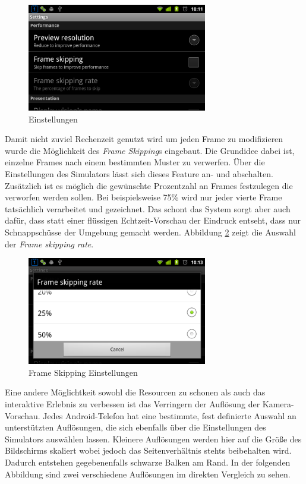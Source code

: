 \documentclass[a4paper]{article}
\begin{document}
\begin{figure}[H]
\centering
\includegraphics[width=0.7\textwidth, trim=0 0 0 39, clip=true]{settings-landscape.png}
\caption{Einstellungen}
\label{settings}
\end{figure}

Damit nicht zuviel Rechenzeit genutzt wird um jeden Frame zu modifizieren wurde die Möglichkeit des \textit{Frame Skipping}s eingebaut. Die Grundidee dabei ist, einzelne Frames nach einem bestimmten Muster zu verwerfen. Über die Einstellungen des Simulators lässt sich dieses Feature an- und abschalten. Zusätzlich ist es möglich die gewünschte Prozentzahl an Frames festzulegen die verworfen werden sollen. Bei beispielsweise 75\% wird nur jeder vierte Frame tatsächlich verarbeitet und gezeichnet. Das schont das System sorgt aber auch dafür, dass statt einer flüssigen Echtzeit-Vorschau der Eindruck entseht, dass nur Schnappschüsse der Umgebung gemacht werden. Abbildung \ref{skiprate} zeigt die Auswahl der \textit{Frame skipping rate}.

\begin{figure}[H]
\centering
\includegraphics[width=0.7\textwidth, trim=0 0 0 39, clip=true]{skiprate-landscape.png}
\caption{Frame Skipping Einstellungen}
\label{skiprate}
\end{figure}

\newpage

Eine andere Möglichtkeit sowohl die Resourcen zu schonen als auch das interaktive Erlebnis zu verbessen ist das Verringern der Auflösung der Kamera-Vorschau. Jedes Android-Telefon hat eine bestimmte, fest definierte Auswahl an unterstützten Auflösungen, die sich ebenfalls über die Einstellungen des Simulators auswählen lassen. Kleinere Auflösungen werden hier auf die Größe des Bildschirms skaliert wobei jedoch das Seitenverhältnis stehts beibehalten wird. Dadurch entstehen gegebenenfalls schwarze Balken am Rand. In der folgenden Abbildung sind zwei verschiedene Auflösungen im direkten Vergleich zu sehen.
\end{document}
